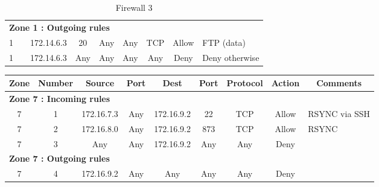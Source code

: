 \documentclass[a4paper,titlepage]{article}
\begin{document}
\begin{table}[h]
\begin{tabular}{c|c|cc|cc|ccl}
		\hline
		\multicolumn{9}{l}{\textbf{Zone 1 : Outgoing rules}}\\
		1 &  & 172.14.6.3 & 20 & Any & Any & TCP & Allow & FTP (data)\\
		1 &  & 172.14.6.3 & Any & Any & Any & Any & Deny & Deny otherwise\\
	\end{tabular}
	\caption{Firewall 3}
\end{table}





\begin{table}[h]
	\center
	\begin{tabular}{c|c|cc|cc|ccl}
		Zone & Number & Source & Port & Dest & Port & Protocol & Action & \multicolumn{1}{c}{Comments}\\
		\hline
		\multicolumn{9}{l}{\textbf{Zone 7 : Incoming rules}}\\
		7 & 1 & 172.16.7.3 & Any & 172.16.9.2 & 22 & TCP & Allow & RSYNC via SSH\\
		7 & 2 & 172.16.8.0 & Any & 172.16.9.2 & 873 & TCP & Allow &  RSYNC\\
		7 & 3 & Any & Any & 172.16.9.2 & Any & Any & Deny & \\
		\hline
		\multicolumn{9}{l}{\textbf{Zone 7 : Outgoing rules}}\\
		7 & 4 & 172.16.9.2 & Any & Any & Any & Any & Deny & \\


\end{tabular}
\end{table}
\end{document}
